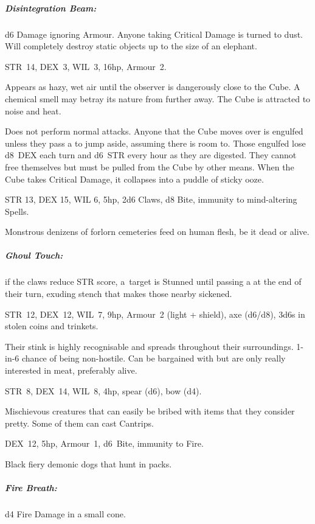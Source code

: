 \documentclass[itdr]{subfiles}
\begin{document}
\subparagraph{Disintegration Beam:} d6 Damage ignoring \mbox{Armour}. Anyone taking Critical Damage is turned to dust. Will completely destroy static objects up to the size of an elephant.

\vfill

STR~14, DEX~3, WIL~3, 16hp, Armour~2.

Appears as hazy, wet air until the observer is dangerously close to the Cube. A chemical smell may betray its nature from further away. The Cube is
attracted to noise and heat.

Does not perform normal attacks. Anyone that the Cube moves over is engulfed unless they pass a  to jump aside, assuming there is room to. Those engulfed lose d8~DEX each turn and d6~STR every hour as they are digested. They cannot free themselves but must be pulled from the Cube by other means. When the Cube takes Critical Damage, it collapses into a puddle of sticky ooze.

\vfill

STR 13, DEX 15, WIL 6, 5hp, 2d6 Claws, d8 Bite, \mbox{immunity} to mind-altering Spells.

Monstrous denizens of forlorn cemeteries feed on human flesh, be it dead or alive.

\subparagraph{Ghoul Touch:} if the claws reduce STR score, \mbox{a target} is Stunned until passing a  at the end of their turn, exuding stench that makes those nearby sickened.

\vfill

STR~12, DEX~12, WIL~7, 9hp, Armour~2 (light + shield), axe (d6/d8), 3d6s in stolen coins and trinkets.

Their stink is highly recognisable and spreads throughout their surroundings.
1-in-6 chance of being non-hostile. Can be bargained with but are only really interested in meat, preferably alive.

\vfill
\break

STR~8, DEX~14, WIL~8, 4hp, spear (d6), bow (d4).

Mischievous creatures that can easily be bribed with items that they consider pretty. Some of them can cast Cantrips.

\vfill

DEX~12, 5hp, Armour~1, d6~Bite, immunity to Fire.

Black fiery demonic dogs that hunt in packs.

\subparagraph{Fire Breath:} d4 Fire Damage in a small cone.
\end{document}
